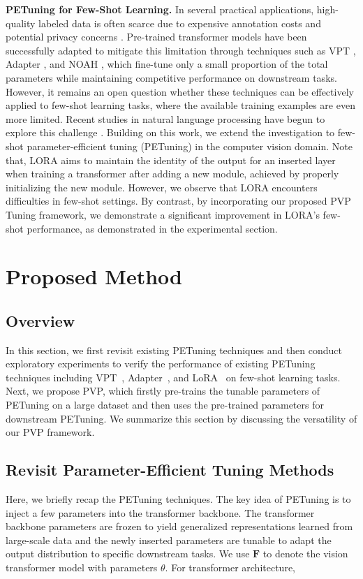 \documentclass[10pt,journal,letterpaper,compsoc]{IEEEtran}
\begin{document}
\textbf{PETuning for Few-Shot Learning.} In several practical applications, high-quality labeled data is often scarce due to expensive annotation costs and potential privacy concerns \cite{hu2021sqn, hu2022sensaturban}. Pre-trained transformer models have been successfully adapted to mitigate this limitation through techniques such as VPT \cite{vpt}, Adapter \cite{adapter}, and NOAH \cite{NOAH}, which fine-tune only a small proportion of the total parameters while maintaining competitive performance on downstream tasks. However, it remains an open question whether these techniques can be effectively applied to few-shot learning tasks, where the available training examples are even more limited. Recent studies in natural language processing have begun to explore this challenge \cite{ppt, 2021Cutting, VirtualPPT, Meta-Adapters, DBLP:conf/acl/0016TYXS022, DBLP:conf/acl/CuiHDHL22}. Building on this work, we extend the investigation to few-shot parameter-efficient tuning (PETuning) in the computer vision domain. Note that, LORA \cite{Lora} aims to maintain the identity of the output for an inserted layer when training a transformer after adding a new module, achieved by properly initializing the new module. However, we observe that LORA encounters difficulties in few-shot settings. By contrast, by incorporating our proposed PVP Tuning framework, we demonstrate a significant improvement in LORA's few-shot performance, as demonstrated in the experimental section.




\section{Proposed Method}

\subsection{Overview}

In this section, we first revisit existing PETuning techniques and then conduct exploratory experiments to verify the performance of existing PETuning techniques including VPT~\cite{vpt}, Adapter~\cite{adapter}, and LoRA~\cite{Lora} on few-shot learning tasks. Next, we propose PVP, which firstly pre-trains the tunable parameters of PETuning on a large dataset and then uses the pre-trained parameters for downstream PETuning. We summarize this section by discussing the versatility of our PVP framework.

\subsection{Revisit Parameter-Efficient Tuning Methods}
Here, we briefly recap the PETuning techniques. The key idea of PETuning is to inject a few parameters into the transformer backbone. The transformer backbone parameters are frozen to yield generalized representations learned from large-scale data and the newly inserted parameters are tunable to adapt the output distribution to specific downstream tasks. We use $\boldsymbol{F}$ to denote the vision transformer model with parameters $\theta$. For transformer architecture,
\end{document}
